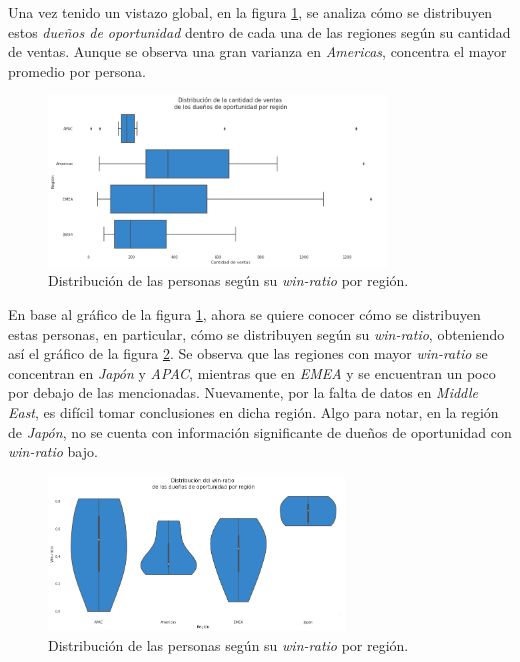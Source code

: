 \documentclass[titlepage,a4paper]{article}
\begin{document}
Una vez tenido un vistazo global, en la figura \ref{fig:box_distribucion_cant_ventas_duenos_opp_por_region}, se analiza cómo se distribuyen estos \textit{dueños de oportunidad} dentro de cada una de las regiones según su cantidad de ventas. Aunque se observa una gran varianza en \textit{Americas}, concentra el mayor promedio por persona.

\begin{figure}[H]
\centering
\includegraphics[width=0.8\textwidth]{images/box_distribucion_cant_ventas_duenos_opp_por_region.png}
\cprotect\caption{\label{fig:box_distribucion_cant_ventas_duenos_opp_por_region} Distribución de las personas según su \textit{win-ratio} por región. }
\end{figure}

En base al gráfico de la figura \ref{fig:box_distribucion_cant_ventas_duenos_opp_por_region}, ahora se quiere conocer cómo se distribuyen estas personas, en particular, cómo se distribuyen según su \textit{win-ratio}, obteniendo así el gráfico de la figura \ref{fig:vi_distribucion_duenos_opp_por_win_ratio}. Se observa que las regiones con mayor \textit{win-ratio} se concentran en \textit{Japón} y \textit{APAC}, mientras que en \textit{EMEA}  y  se encuentran un poco por debajo de las mencionadas. Nuevamente, por la falta de datos en \textit{Middle East}, es difícil tomar conclusiones en dicha región. Algo para notar, en la región de \textit{Japón}, no se cuenta con información significante de dueños de oportunidad con \textit{win-ratio} bajo.

\begin{figure}[H]
\centering
\includegraphics[width=0.7\textwidth]{images/vi_distribucion_duenos_opp_por_win_ratio_2.png}
\cprotect\caption{\label{fig:vi_distribucion_duenos_opp_por_win_ratio} Distribución de las personas según su \textit{win-ratio} por región. }
\end{figure}
\end{document}
